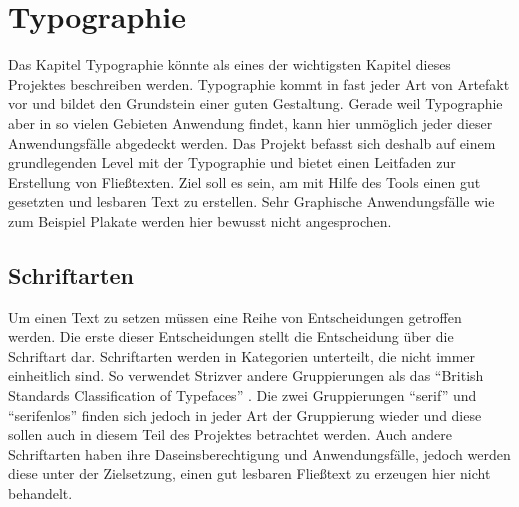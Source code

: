 
\newcommand{\chaptertitle}{Typographie}

\chapter{\chaptertitle} %

\label{Typographie} %

\lhead{\chaptername{} \thechapter{} - \emph{\chaptertitle}} %


Das Kapitel Typographie könnte als eines der wichtigsten Kapitel dieses Projektes beschreiben werden. Typographie kommt in fast jeder Art von Artefakt vor und bildet den Grundstein einer guten Gestaltung. Gerade weil Typographie aber in so vielen Gebieten Anwendung findet, kann hier unmöglich jeder dieser Anwendungsfälle abgedeckt werden.
Das Projekt befasst sich deshalb auf einem grundlegenden Level mit der Typographie und bietet einen Leitfaden zur Erstellung von Fließtexten. Ziel soll es sein, am mit Hilfe des Tools einen gut gesetzten und lesbaren Text zu erstellen.
Sehr Graphische Anwendungsfälle wie zum Beispiel Plakate werden hier bewusst nicht angesprochen.

\section{Schriftarten}
Um einen Text zu setzen müssen eine Reihe von Entscheidungen getroffen werden. Die erste dieser Entscheidungen stellt die Entscheidung über die Schriftart dar.
Schriftarten werden in Kategorien unterteilt, die nicht immer einheitlich sind. So verwendet Strizver \cite{strizver2014type} andere Gruppierungen als  das “British Standards Classification of Typefaces” \cite[S. 51]{baines2005type}. Die zwei Gruppierungen “serif” und “serifenlos” finden sich jedoch in jeder Art der Gruppierung wieder und diese sollen auch in diesem Teil des Projektes betrachtet werden.
Auch andere Schriftarten haben ihre Daseinsberechtigung und Anwendungsfälle, jedoch werden diese unter der Zielsetzung, einen gut lesbaren Fließtext zu erzeugen hier nicht behandelt.

